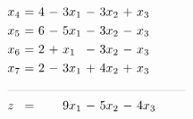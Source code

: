 \documentclass [a4paper,11pt]{article}
\begin{document}
\begin{enumerate}
\begin{enumerate}
\begin{align*}
                \begin{alignedat}{6}
                & x_4 &\ = &\ 4  &\ - &\ 3x_1 &\ - &\ 3x_2 &\ + &\ x_3 \\
                & x_5 &\ = &\ 6  &\ - &\ 5x_1 &\ - &\ 3x_2 &\ - &\ x_3 \\
                & x_6 &\ = &\ 2  &\ + &\  x_1 &\ - &\ 3x_2 &\ - &\ x_3 \\
                & x_7 &\ = &\ 2  &\ - &\ 3x_1 &\ + &\ 4x_2 &\ + &\ x_3 \\
                &\rlap{\rule{5cm}{.1pt}} &&&&&&&&\\
                & z   &\ = &     &    &\ 9x_1 &\ - &\ 5x_2 &\ - &\ 4x_3
                \end{alignedat}
                \end{align*}


\end{enumerate}
\end{enumerate}
\end{document}
